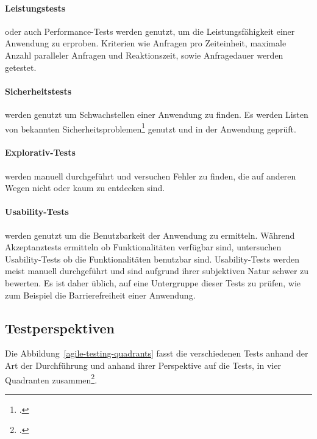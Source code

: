 \paragraph{Leistungstests} oder auch Performance-Tests werden genutzt, um die Leistungsfähigkeit einer Anwendung zu erproben. Kriterien wie Anfragen pro Zeiteinheit, maximale Anzahl paralleler Anfragen und Reaktionszeit, sowie Anfragedauer werden getestet.

\paragraph{Sicherheitstests} werden genutzt um Schwachstellen einer Anwendung zu finden. Es werden Listen von bekannten Sicherheitsproblemen\footcite[vgl.][]{owasp-vulnerability} genutzt und in der Anwendung geprüft.

\paragraph{Explorativ-Tests} werden manuell durchgeführt und versuchen Fehler zu finden, die auf anderen Wegen nicht oder kaum zu entdecken sind.

\paragraph{Usability-Tests} werden genutzt um die Benutzbarkeit der Anwendung zu ermitteln. Während Akzeptanztests ermitteln ob Funktionalitäten verfügbar sind, untersuchen Usability-Tests ob die Funktionalitäten benutzbar sind. Usability-Tests werden meist manuell durchgeführt und sind aufgrund ihrer subjektiven Natur schwer zu bewerten. Es ist daher üblich, auf eine Untergruppe dieser Tests zu prüfen, wie zum Beispiel die Barrierefreiheit einer Anwendung.

\subsection{Testperspektiven}

Die Abbildung~\ref{agile-testing-quadrants} fasst die verschiedenen Tests anhand der Art der Durchführung und anhand ihrer Perspektive auf die Tests, in vier Quadranten zusammen\footcite[vgl.][Kapitel: The Agile testing matrix]{cd-docker-jenkins}.

